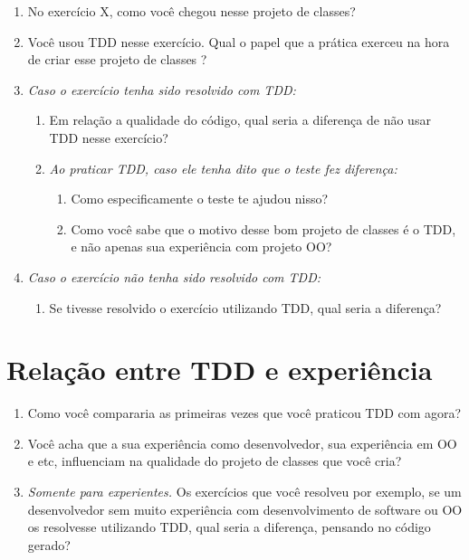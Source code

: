 \begin{enumerate}
	
	\item No exercício X, como você chegou nesse projeto de classes? 

	\item Você usou TDD nesse exercício. Qual o papel que a prática exerceu na hora de criar esse projeto de classes ?

	\item \textit{Caso o exercício tenha sido resolvido com TDD:}
		\begin{enumerate}
			\item Em relação a qualidade do código, qual seria a diferença de não usar TDD nesse exercício?
		
			\item \textit{Ao praticar TDD, caso ele tenha dito que o teste fez diferença:}
				\begin{enumerate}
					\item Como especificamente o teste te ajudou nisso?
	
					\item Como você sabe que o motivo desse bom projeto de classes é o TDD, e não apenas sua experiência
					com projeto OO?
				\end{enumerate}
		\end{enumerate}
		
	\item \textit{Caso o exercício não tenha sido resolvido com TDD:}
		\begin{enumerate}
			\item Se tivesse resolvido o exercício utilizando TDD, qual seria a diferença?
		\end{enumerate}

\end{enumerate}

\section{Relação entre TDD e experiência}

\begin{enumerate}
	\item Como você compararia as primeiras vezes que você praticou TDD com agora?

	\item Você acha que a sua experiência como desenvolvedor, sua experiência em OO e etc,
	influenciam na qualidade do projeto de classes que você cria?

	\item \textit{Somente para experientes.} Os exercícios que você resolveu por exemplo, se um desenvolvedor
	sem muito experiência com desenvolvimento de software ou OO os resolvesse utilizando TDD, qual seria a diferença,
	pensando no código gerado?

\end{enumerate}

